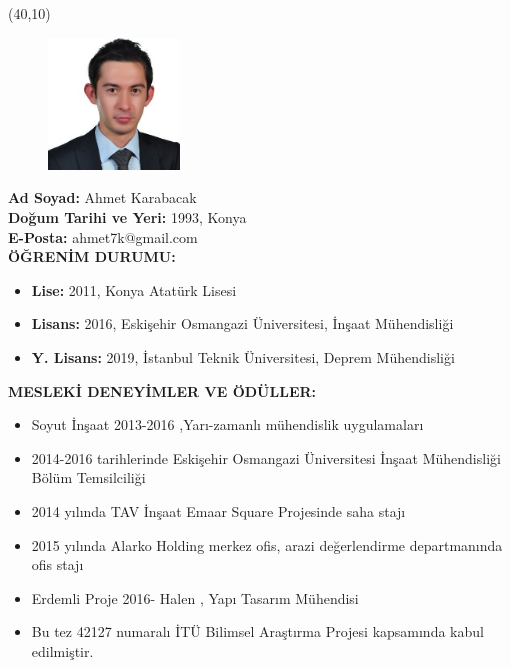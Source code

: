 \vspace{10mm}

\noindent \newsavebox{\mysquare}
\savebox{\mysquare}{\textcolor{black}{\rule[2.3pt]{3.4pt}{3.4pt}}}

\setlength{\TPHorizModule}{10pt}
\setlength{\TPVertModule}{10pt}

\begin{textblock}{1}(40,10)
	\begin{figure}[p]
		\includegraphics[width=3.5cm,keepaspectratio=true]{./fig/CV.jpg}
	\end{figure}
\end{textblock}

\noindent \textbf{Ad Soyad:} Ahmet Karabacak \\

\vspace{-3mm}
 \textbf{Doğum Tarihi ve Yeri:} 1993, Konya \\

\vspace{-3mm}
 \textbf{E-Posta:} ahmet7k@gmail.com \\

\textbf{ÖĞRENİM DURUMU:} \vspace{-3mm}

\begin{itemize}
\item \textbf{Lise:} 2011, Konya Atatürk Lisesi 
\item \textbf{Lisans:} 2016, Eskişehir Osmangazi Üniversitesi, İnşaat Mühendisliği 
\item \textbf{Y. Lisans:} 2019, İstanbul Teknik Üniversitesi, Deprem Mühendisliği
\end{itemize}
\textbf{MESLEKİ DENEYİMLER VE ÖDÜLLER:} \vspace{-3mm}

\begin{itemize}
\item Soyut İnşaat 2013-2016 ,Yarı-zamanlı mühendislik uygulamaları
\item 2014-2016 tarihlerinde Eskişehir Osmangazi Üniversitesi İnşaat Mühendisliği
Bölüm Temsilciliği
\item 2014 yılında TAV İnşaat Emaar Square Projesinde saha stajı
\item 2015 yılında Alarko Holding merkez ofis, arazi değerlendirme departmanında
ofis stajı
\item Erdemli Proje 2016- Halen , Yapı Tasarım Mühendisi
\item Bu tez 42127 numaralı İTÜ Bilimsel Araştırma Projesi kapsamında kabul
edilmiştir.
\end{itemize}
